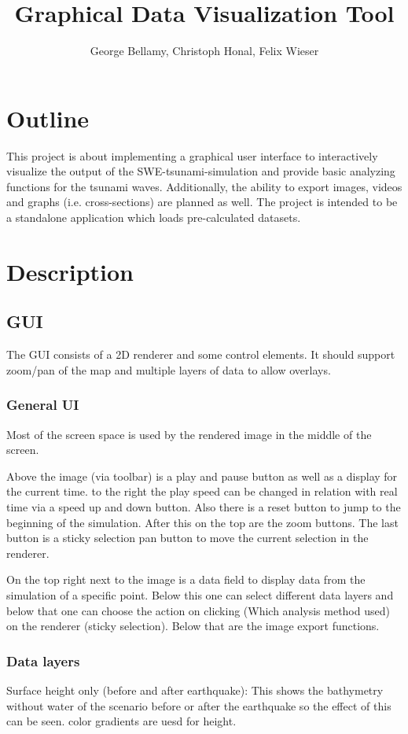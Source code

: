 \documentclass[paper=a4]{proc}
\title{Graphical Data Visualization Tool}
\author{George Bellamy, Christoph Honal, Felix Wieser}
\begin{document}
	\maketitle
	\thispagestyle{plain}	%
	\section{Outline}
		This project is about implementing a graphical user interface to interactively visualize the output of the SWE-tsunami-simulation and provide basic analyzing functions for the tsunami waves. Additionally, the ability to export images, videos and graphs (i.e. cross-sections) are planned as well. The project is intended to be a standalone application which loads pre-calculated datasets.
	\section{Description}
		\subsection{GUI}
			The GUI consists of a 2D renderer and some control elements. It should support zoom/pan of the map and multiple layers of data to allow overlays.
			\subsubsection{General UI}
			Most of the screen space is used by the rendered image in the middle of the screen. 
			
			Above the image (via toolbar) is a play and pause button as well as a display for the current time. to the right the play speed can be changed in relation with real time via a speed up and down button. Also there is a reset button to jump to the beginning of the simulation. After this on the top are the zoom buttons. The last button is a sticky selection pan button to move the current selection in the renderer. 
			
			On the top right next to the image is a data field to display data from the simulation of a specific point. Below this one can select different data layers and below that one can choose the action on clicking (Which analysis method used) on the renderer (sticky selection). Below that are the image export functions.
			
			\subsubsection{Data layers}
			Surface height only (before and after earthquake): \newline
			This shows the bathymetry without water of the scenario before or after the 			earthquake so the effect of this can be seen. color gradients are uesd for 				height.
			
\end{document}
